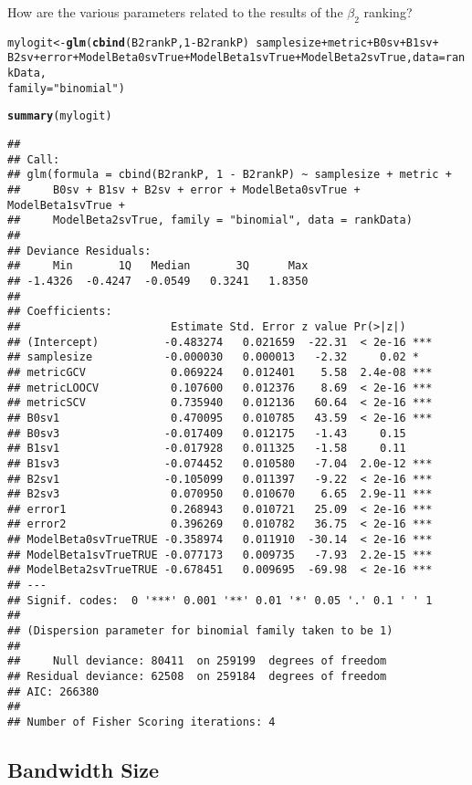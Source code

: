 \documentclass{article}\usepackage[]{graphicx}\usepackage[]{color}
\makeatletter
\newcommand{\hlnum}[1]{\textcolor[rgb]{0.686,0.059,0.569}{#1}}%
\newcommand{\hlstr}[1]{\textcolor[rgb]{0.192,0.494,0.8}{#1}}%
\newcommand{\hlopt}[1]{\textcolor[rgb]{0,0,0}{#1}}%
\newcommand{\hlstd}[1]{\textcolor[rgb]{0.345,0.345,0.345}{#1}}%
\newcommand{\hlkwb}[1]{\textcolor[rgb]{0.69,0.353,0.396}{#1}}%
\newcommand{\hlkwc}[1]{\textcolor[rgb]{0.333,0.667,0.333}{#1}}%
\newcommand{\hlkwd}[1]{\textcolor[rgb]{0.737,0.353,0.396}{\textbf{#1}}}%
\newenvironment{kframe}{%
 \def\at@end@of@kframe{}%
 \ifinner\ifhmode%
  \def\at@end@of@kframe{\end{minipage}}%
  \begin{minipage}{\columnwidth}%
 \fi\fi%
 \def\FrameCommand##1{\hskip\@totalleftmargin \hskip-\fboxsep
 \colorbox{shadecolor}{##1}\hskip-\fboxsep
     \hskip-\linewidth \hskip-\@totalleftmargin \hskip\columnwidth}%
 \MakeFramed {\advance\hsize-\width
   \@totalleftmargin\z@ \linewidth\hsize
   \@setminipage}}%
 {\par\unskip\endMakeFramed%
 \at@end@of@kframe}
\newenvironment{knitrout}{}{} %
\makeatother
\begin{document}
How are the various parameters related to the results of the $\beta _2$ ranking?
\begin{knitrout}
\color{fgcolor}\begin{kframe}
\begin{alltt}
\hlstd{mylogit} \hlkwb{<-} \hlkwd{glm}\hlstd{(}\hlkwd{cbind}\hlstd{(B2rankP,} \hlnum{1} \hlopt{-} \hlstd{B2rankP)} \hlopt{~} \hlstd{samplesize} \hlopt{+} \hlstd{metric} \hlopt{+} \hlstd{B0sv} \hlopt{+} \hlstd{B1sv} \hlopt{+}
    \hlstd{B2sv} \hlopt{+} \hlstd{error} \hlopt{+} \hlstd{ModelBeta0svTrue} \hlopt{+} \hlstd{ModelBeta1svTrue} \hlopt{+} \hlstd{ModelBeta2svTrue,} \hlkwc{data} \hlstd{= rankData,}
    \hlkwc{family} \hlstd{=} \hlstr{"binomial"}\hlstd{)}
\end{alltt}


{\ttfamily\noindent\color{warningcolor}{\#\# Warning: non-integer counts in a binomial glm!}}\begin{alltt}
\hlkwd{summary}\hlstd{(mylogit)}
\end{alltt}
\begin{verbatim}
## 
## Call:
## glm(formula = cbind(B2rankP, 1 - B2rankP) ~ samplesize + metric + 
##     B0sv + B1sv + B2sv + error + ModelBeta0svTrue + ModelBeta1svTrue + 
##     ModelBeta2svTrue, family = "binomial", data = rankData)
## 
## Deviance Residuals: 
##     Min       1Q   Median       3Q      Max  
## -1.4326  -0.4247  -0.0549   0.3241   1.8350  
## 
## Coefficients:
##                       Estimate Std. Error z value Pr(>|z|)    
## (Intercept)          -0.483274   0.021659  -22.31  < 2e-16 ***
## samplesize           -0.000030   0.000013   -2.32     0.02 *  
## metricGCV             0.069224   0.012401    5.58  2.4e-08 ***
## metricLOOCV           0.107600   0.012376    8.69  < 2e-16 ***
## metricSCV             0.735940   0.012136   60.64  < 2e-16 ***
## B0sv1                 0.470095   0.010785   43.59  < 2e-16 ***
## B0sv3                -0.017409   0.012175   -1.43     0.15    
## B1sv1                -0.017928   0.011325   -1.58     0.11    
## B1sv3                -0.074452   0.010580   -7.04  2.0e-12 ***
## B2sv1                -0.105099   0.011397   -9.22  < 2e-16 ***
## B2sv3                 0.070950   0.010670    6.65  2.9e-11 ***
## error1                0.268943   0.010721   25.09  < 2e-16 ***
## error2                0.396269   0.010782   36.75  < 2e-16 ***
## ModelBeta0svTrueTRUE -0.358974   0.011910  -30.14  < 2e-16 ***
## ModelBeta1svTrueTRUE -0.077173   0.009735   -7.93  2.2e-15 ***
## ModelBeta2svTrueTRUE -0.678451   0.009695  -69.98  < 2e-16 ***
## ---
## Signif. codes:  0 '***' 0.001 '**' 0.01 '*' 0.05 '.' 0.1 ' ' 1
## 
## (Dispersion parameter for binomial family taken to be 1)
## 
##     Null deviance: 80411  on 259199  degrees of freedom
## Residual deviance: 62508  on 259184  degrees of freedom
## AIC: 266380
## 
## Number of Fisher Scoring iterations: 4
\end{verbatim}
\end{kframe}
\end{knitrout}

\subsection{Bandwidth Size}
\end{document}
